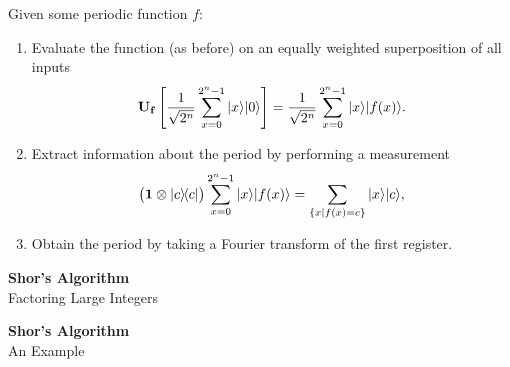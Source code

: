 \documentclass{slides}
\begin{document}
Given some periodic function $f$:
\begin{enumerate}
\item Evaluate the function 
(as before) on an equally weighted superposition of all 
inputs 
\begin{equation*}
{\bf U_f} \left\lbrack
\frac{1}{\sqrt{2^n}}\sum_{x=0}^{2^n-1}{|{x}\rangle}{|{0}\rangle}
\right\rbrack
= 
\frac{1}{\sqrt{2^n}}\sum_{x=0}^{2^n-1}{|{x}\rangle}{|{f(x)}\rangle}.
\end{equation*}
\item Extract information about the period by performing
a measurement
\begin{equation*}
\bigl(
{\bf 1}\otimes{|{c}\rangle\!\langle{c}|}
\bigr)
\sum_{x=0}^{2^n-1}{|{x}\rangle}{|{f(x)}\rangle}
= \sum_{\lbrace x|f(x)=c\rbrace} {|{x}\rangle}{|{c}\rangle},
\end{equation*}
\item Obtain the period by taking a Fourier
transform of the first register.
\end{enumerate}


\pagebreak


\begin{center}
\textbf{Shor's Algorithm}\\
\bigskip
Factoring Large Integers
\end{center}

\pagebreak

\begin{center}
\textbf{Shor's Algorithm}\\
\bigskip
An Example
\end{center}
\end{document}
